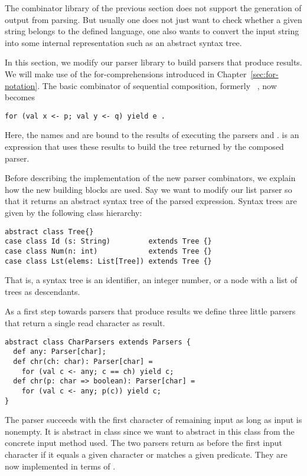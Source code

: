 \documentclass[a4paper,12pt,twoside,titlepage]{book}
\begin{document}
{The combinator library of the previous section does not support the
generation of output from parsing. But usually one does not just want
to check whether a given string belongs to the defined language, one
also wants to convert the input string into some internal
representation such as an abstract syntax tree.

In this section, we modify our parser library to build parsers that
produce results. We will make use of the for-comprehensions introduced
in Chapter~\ref{sec:for-notation}.  The basic combinator of sequential
composition, formerly ~, now becomes
\begin{lstlisting}
for (val x <- p; val y <- q) yield e .
\end{lstlisting}
Here, the names  and  are bound to the results of
executing the parsers  and .  is an expression
that uses these results to build the tree returned by the composed
parser.

Before describing the implementation of the new parser combinators, we
explain how the new building blocks are used. Say we want to modify
our list parser so that it returns an abstract syntax tree of the
parsed expression. Syntax trees are given by the following class hierarchy:
\begin{lstlisting}
abstract class Tree{}
case class Id (s: String)         extends Tree {}
case class Num(n: int)            extends Tree {}
case class Lst(elems: List[Tree]) extends Tree {}
\end{lstlisting}
That is, a syntax tree is an identifier, an integer number, or a
 node with a list of trees as descendants.

As a first step towards parsers that produce results we define three
little parsers that return a single read character as result.
\begin{lstlisting}
abstract class CharParsers extends Parsers {
  def any: Parser[char];
  def chr(ch: char): Parser[char] = 
    for (val c <- any; c == ch) yield c;
  def chr(p: char => boolean): Parser[char] = 
    for (val c <- any; p(c)) yield c;
}
\end{lstlisting}
The  parser succeeds with the first character of remaining
input as long as input is nonempty. It is abstract in class
 since we want to abstract in this class from the
concrete input method used.  The two  parsers return as before
the first input character if it equals a given character or matches a
given predicate. They are now implemented in terms of .

}
\end{document}
